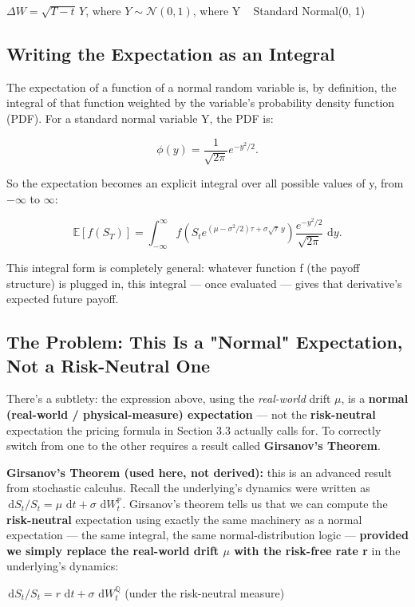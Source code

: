 \documentclass[12pt,openany]{book}
\theoremstyle{definition}
\theoremstyle{remark}
\newcommand{\E}{\mathbb{E}}
\newcommand{\dd}{\,\mathrm{d}}
\begin{document}
\(\Delta W=\sqrt{T-t}\,Y\), where \(Y\sim\mathcal N(0,1)\), where Y ~ Standard Normal(0, 1)

\subsection{Writing the Expectation as an Integral}

The expectation of a function of a normal random variable is, by definition, the integral of that function weighted by the variable's probability density function (PDF). For a standard normal variable Y, the PDF is:

\[\phi(y)=\frac1{\sqrt{2\pi}}e^{-y^2/2}.\]

So the expectation becomes an explicit integral over all possible values of y, from \(-\)\(\infty\) to \(\infty\):

\[
\E[f(S_T)]=\int_{-\infty}^{\infty}
f\!\left(S_t e^{(\mu-\sigma^2/2)\tau+\sigma\sqrt{\tau}\,y}\right)
\frac{e^{-y^2/2}}{\sqrt{2\pi}}\,\dd y.
\]

This integral form is completely general: whatever function f (the payoff structure) is plugged in, this integral --- once evaluated --- gives that derivative's expected future payoff.

\subsection{The Problem: This Is a "Normal" Expectation, Not a Risk-Neutral One}

There's a subtlety: the expression above, using the \emph{real-world} drift \(\mu\), is a \textbf{normal (real-world / physical-measure) expectation} --- not the \textbf{risk-neutral} expectation the pricing formula in Section 3.3 actually calls for. To correctly switch from one to the other requires a result called \textbf{Girsanov's Theorem}.

\textbf{Girsanov's Theorem (used here, not derived):} this is an advanced result from stochastic calculus. Recall the underlying's dynamics were written as \(\dd S_t/S_t=\mu\,\dd t+\sigma\,\dd W_t^{\mathbb P}\). Girsanov's theorem tells us that we can compute the \textbf{risk-neutral} expectation using exactly the same machinery as a normal expectation --- the same integral, the same normal-distribution logic --- \textbf{provided we simply replace the real-world drift \(\mu\) with the risk-free rate r} in the underlying's dynamics:

\(\dd S_t/S_t=r\,\dd t+\sigma\,\dd W_t^{\mathbb Q}\) (under the risk-neutral measure)
\end{document}
